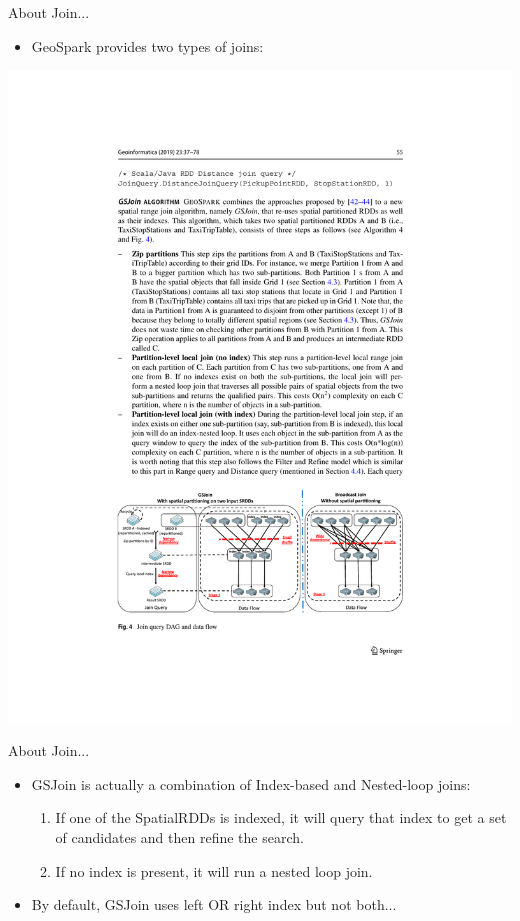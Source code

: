 \documentclass{beamer}
\begin{document}
\begin{frame}{About Join...}
    \begin{itemize}
        \item GeoSpark provides two types of joins:
    \end{itemize}
    \centering
    \includegraphics[trim=4.0cm 4.5cm 4.0cm 18.0cm, clip, width=1\textwidth]{figures/joins}
\end{frame}

\begin{frame}{About Join...}
    \begin{itemize}
        \item GSJoin is actually a combination of Index-based and Nested-loop joins:
        \begin{enumerate}
            \item If one of the SpatialRDDs is indexed, it will query that index to get a set of candidates and then refine the search.
            \item If no index is present, it will run a nested loop join.
        \end{enumerate}
        \item By default, GSJoin uses left OR right index but not both...
    \end{itemize}
\end{frame}
\end{document}
